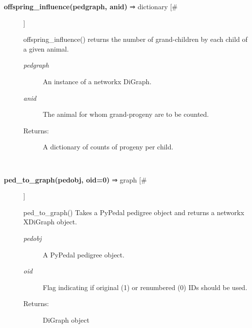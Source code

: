 \begin{description}
\item[\textbf{offspring\_influence(pedgraph, anid)}
 ⇒ dictionary [\#]]

 offspring\_influence() returns the number of grand-children by each child of a given animal.
\begin{description}
\item[\emph{pedgraph}
] An instance of a networkx DiGraph.
\item[\emph{anid}
] The animal for whom grand-progeny are to be counted.
\item[Returns:] A dictionary of counts of progeny per child.

\end{description}
\\ 

\item[\textbf{ped\_to\_graph(pedobj, oid=0)}
 ⇒ graph [\#]]

 ped\_to\_graph() Takes a PyPedal pedigree object and returns a networkx XDiGraph object.
\begin{description}
\item[\emph{pedobj}
] A PyPedal pedigree object.
\item[\emph{oid}
] Flag indicating if original (1) or renumbered (0) IDs should be used.
\item[Returns:] DiGraph object

\end{description}
\\ 


\end{description}


